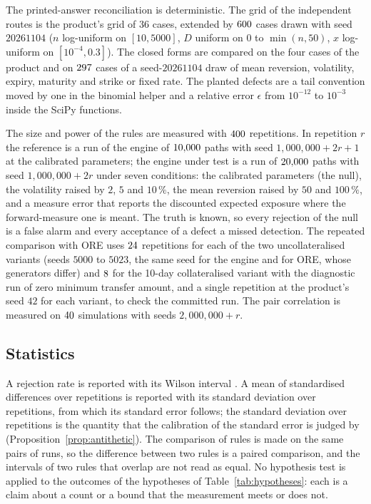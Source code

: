 The printed-answer reconciliation is deterministic. The grid of the independent routes is the product's grid of $36$ cases, extended by $600$ cases drawn with seed $20261104$ ($n$ log-uniform on $[10,5000]$, $D$ uniform on $0$ to $\min(n,50)$, $x$ log-uniform on $[10^{-4},0.3]$). The closed forms are compared on the four cases of the product and on $297$ cases of a seed-$20261104$ draw of mean reversion, volatility, expiry, maturity and strike or fixed rate. The planted defects are a tail convention moved by one in the binomial helper and a relative error $\epsilon$ from $10^{-12}$ to $10^{-3}$ inside the SciPy functions.

The size and power of the rules are measured with $400$ repetitions. In repetition $r$ the reference is a run of the engine of $10{,}000$ paths with seed $1{,}000{,}000+2r+1$ at the calibrated parameters; the engine under test is a run of $20{,}000$ paths with seed $1{,}000{,}000+2r$ under seven conditions: the calibrated parameters (the null), the volatility raised by $2$, $5$ and $10\,\%$, the mean reversion raised by $50$ and $100\,\%$, and a measure error that reports the discounted expected exposure where the forward-measure one is meant. The truth is known, so every rejection of the null is a false alarm and every acceptance of a defect a missed detection. The repeated comparison with ORE uses $24$ repetitions for each of the two uncollateralised variants (seeds $5000$ to $5023$, the same seed for the engine and for ORE, whose generators differ) and $8$ for the 10-day collateralised variant with the diagnostic run of zero minimum transfer amount, and a single repetition at the product's seed $42$ for each variant, to check the committed run. The pair correlation is measured on $40$ simulations with seeds $2{,}000{,}000+r$.

\subsection{Statistics}
\label{sec:design-statistics}

A rejection rate is reported with its Wilson interval \citep{brown2001}. A mean of standardised differences over repetitions is reported with its standard deviation over repetitions, from which its standard error follows; the standard deviation over repetitions is the quantity that the calibration of the standard error is judged by (Proposition~\ref{prop:antithetic}). The comparison of rules is made on the same pairs of runs, so the difference between two rules is a paired comparison, and the intervals of two rules that overlap are not read as equal. No hypothesis test is applied to the outcomes of the hypotheses of Table~\ref{tab:hypotheses}: each is a claim about a count or a bound that the measurement meets or does not.

